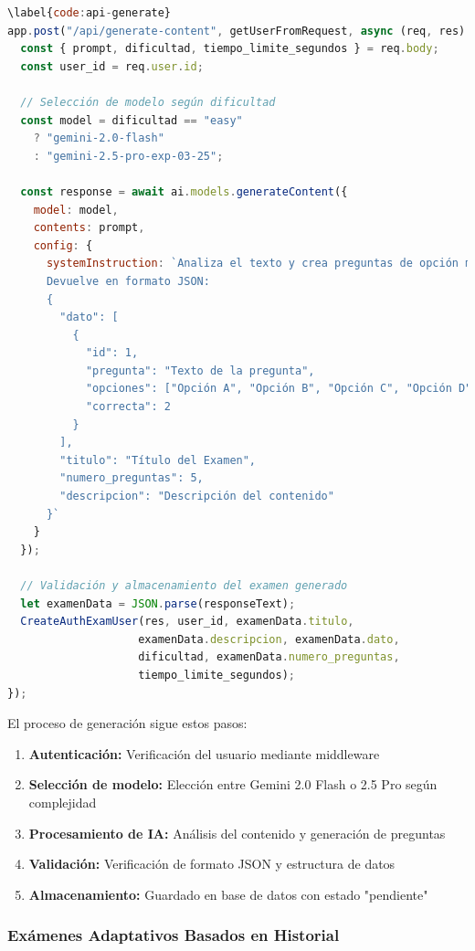 \documentclass[12pt,a4paper]{report}
\begin{document}
\begin{lstlisting}[language=JavaScript, caption={Código \ref{code:api-generate}: API principal de generación de exámenes}]
\label{code:api-generate}
app.post("/api/generate-content", getUserFromRequest, async (req, res) => {
  const { prompt, dificultad, tiempo_limite_segundos } = req.body;
  const user_id = req.user.id;

  // Selección de modelo según dificultad
  const model = dificultad == "easy" 
    ? "gemini-2.0-flash" 
    : "gemini-2.5-pro-exp-03-25";
  
  const response = await ai.models.generateContent({
    model: model,
    contents: prompt,
    config: {
      systemInstruction: `Analiza el texto y crea preguntas de opción múltiple.
      Devuelve en formato JSON:
      {
        "dato": [
          {
            "id": 1,
            "pregunta": "Texto de la pregunta",
            "opciones": ["Opción A", "Opción B", "Opción C", "Opción D"],
            "correcta": 2
          }
        ],
        "titulo": "Título del Examen",
        "numero_preguntas": 5,
        "descripcion": "Descripción del contenido"
      }`
    }
  });

  // Validación y almacenamiento del examen generado
  let examenData = JSON.parse(responseText);
  CreateAuthExamUser(res, user_id, examenData.titulo, 
                    examenData.descripcion, examenData.dato, 
                    dificultad, examenData.numero_preguntas, 
                    tiempo_limite_segundos);
});
\end{lstlisting}

El proceso de generación sigue estos pasos:

\begin{enumerate}
\item \textbf{Autenticación:} Verificación del usuario mediante middleware
\item \textbf{Selección de modelo:} Elección entre Gemini 2.0 Flash o 2.5 Pro según complejidad
\item \textbf{Procesamiento de IA:} Análisis del contenido y generación de preguntas
\item \textbf{Validación:} Verificación de formato JSON y estructura de datos
\item \textbf{Almacenamiento:} Guardado en base de datos con estado "pendiente"
\end{enumerate}

\subsubsection{Exámenes Adaptativos Basados en Historial}
\end{document}
